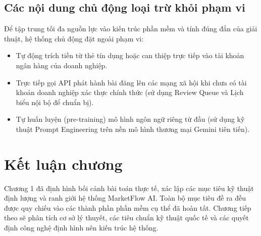 \subsection{Các nội dung chủ động loại trừ khỏi phạm vi}
Để tập trung tối đa nguồn lực vào kiến trúc phần mềm và tính đúng đắn của giải thuật, hệ thống chủ động đặt ngoài phạm vi:
\begin{itemize}
  \item Tự động trích tiền từ thẻ tín dụng hoặc can thiệp trực tiếp vào tài khoản ngân hàng của doanh nghiệp.
  \item Trực tiếp gọi API phát hành bài đăng lên các mạng xã hội khi chưa có tài khoản doanh nghiệp xác thực chính thức (sử dụng Review Queue và Lịch biểu nội bộ để chuẩn bị).
  \item Tự huấn luyện (pre-training) mô hình ngôn ngữ riêng từ đầu (sử dụng kỹ thuật Prompt Engineering trên nền mô hình thương mại Gemini tiên tiến).
\end{itemize}

\section{Kết luận chương}

Chương 1 đã định hình bối cảnh bài toán thực tế, xác lập các mục tiêu kỹ thuật định lượng và ranh giới hệ thống MarketFlow AI. Toàn bộ mục tiêu đề ra đều được quy chiếu vào các thành phần phần mềm cụ thể đã hoàn tất. Chương tiếp theo sẽ phân tích cơ sở lý thuyết, các tiêu chuẩn kỹ thuật quốc tế và các quyết định công nghệ định hình nên kiến trúc hệ thống.

